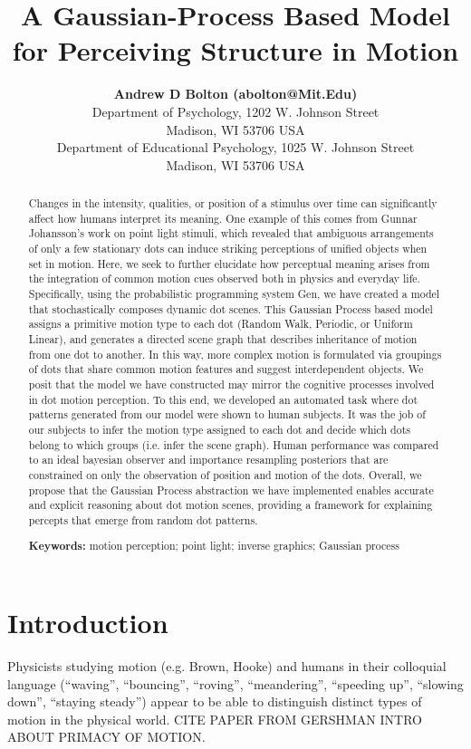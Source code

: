 \documentclass[10pt,letterpaper]{article}
\title{A Gaussian-Process Based Model for Perceiving Structure in Motion}
\author{{\large \bf Andrew D Bolton (abolton@Mit.Edu)} \\
  Department of Psychology, 1202 W. Johnson Street \\
  Madison, WI 53706 USA
  \AND {\large \bf Sharon J.~Derry (SDJ@Macc.Wisc.Edu)} \\
  Department of Educational Psychology, 1025 W. Johnson Street \\
  Madison, WI 53706 USA}
\begin{document}
\maketitle


\begin{abstract}

  Changes in the intensity, qualities, or position of a stimulus over time can significantly affect how humans interpret its meaning. One example of this comes from Gunnar Johansson's work on point light stimuli, which revealed that ambiguous arrangements of only a few stationary dots can induce striking perceptions of unified objects when set in motion. Here, we seek to further elucidate how perceptual meaning arises from the integration of common motion cues observed both in physics and everyday life. Specifically, using the probabilistic programming system Gen, we have created a model that stochastically composes dynamic dot scenes. This Gaussian Process based model assigns a primitive motion type to each dot (Random Walk, Periodic, or Uniform Linear), and generates a directed scene graph that describes inheritance of motion from one dot to another. In this way, more complex motion is formulated via groupings of dots that share common motion features and suggest interdependent objects. We posit that the model we have constructed may mirror the cognitive processes involved in dot motion perception. To this end, we developed an automated task where dot patterns generated from our model were shown to human subjects. It was the job of our subjects to infer the motion type assigned to each dot and decide which dots belong to which groups (i.e. infer the scene graph). Human performance was compared to an ideal bayesian observer and importance resampling posteriors that are constrained on only the observation of position and motion of the dots. Overall, we propose that the Gaussian Process abstraction we have implemented enables accurate and explicit reasoning about dot motion scenes, providing a framework for explaining percepts that emerge from random dot patterns.

\textbf{Keywords:}
motion perception; point light; inverse graphics; Gaussian process  
\end{abstract}

\section{Introduction}

Physicists studying motion (e.g. Brown, Hooke) and humans in their colloquial language (``waving'', ``bouncing'', ``roving'', ``meandering'', ``speeding up'', ``slowing down'', ``staying steady'') appear to be able to distinguish distinct types of motion in the physical world. CITE PAPER FROM GERSHMAN INTRO ABOUT PRIMACY OF MOTION. 
\end{document}
